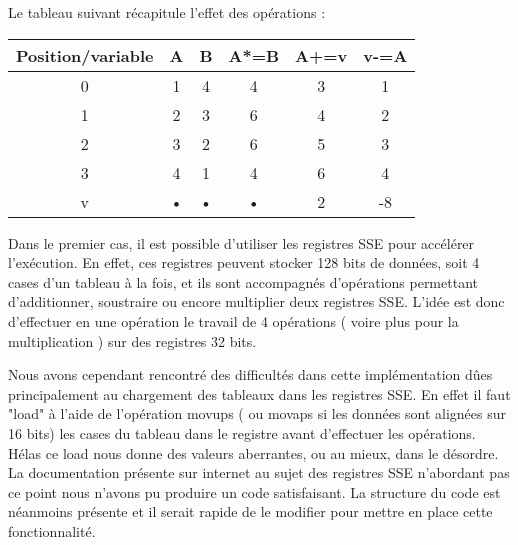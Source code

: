 \vspace{0.5cm}
Le tableau suivant récapitule l'effet des opérations : \\

\vspace{0.5cm}
\begin{tabular}[h]{|c|c|c|c|c|c|}
\hline Position/variable & A & B & A*=B & A+=v & v-=A \\ 
\hline 0 & 1 & 4 & 4 & 3 & 1 \\ 
\hline 1 & 2 & 3 & 6 & 4 & 2 \\ 
\hline 2 & 3 & 2 & 6 & 5 & 3 \\ 
\hline 3 & 4 & 1 & 4 & 6 & 4 \\ 
\hline v & • & • & • & 2 & -8 \\ 
\hline 
\end{tabular} 

\vspace{0.5cm}
Dans le premier cas, il est possible d'utiliser les registres SSE pour accélérer l'exécution. En effet, ces registres peuvent stocker 128 bits de données, soit 4 cases d'un tableau à la fois, et ils sont accompagnés d'opérations permettant d'additionner, soustraire ou encore multiplier deux registres SSE. L'idée est donc d'effectuer en une opération le travail de 4 opérations ( voire plus pour la multiplication ) sur des registres 32 bits. 

\vspace{0.5cm}
Nous avons cependant rencontré des difficultés dans cette implémentation d\^ues principalement au chargement des tableaux dans les registres SSE. En effet il faut "load" à l'aide de l'opération movups ( ou movaps si les données sont alignées sur 16 bits) les cases du tableau dans le registre avant d'effectuer les opérations. Hélas ce load nous donne des valeurs aberrantes, ou au mieux, dans le désordre. La documentation présente sur internet au sujet des registres SSE n'abordant pas ce point nous n'avons pu produire un code satisfaisant. La structure du code est néanmoins présente et il serait rapide de le modifier pour mettre en place cette fonctionnalité.	 
